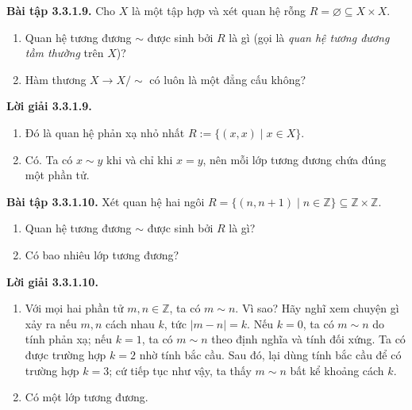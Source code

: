 \noindent\textbf{Bài tập 3.3.1.9.} Cho $X$ là một tập hợp và xét quan hệ rỗng $R=\varnothing\subseteq X\times X$.
\begin{enumerate}[label=\alph*.]
\item Quan hệ tương đương $\sim$ được sinh bởi $R$ là gì (gọi là \emph{quan hệ tương đương tầm thường} trên $X$)?
\item Hàm thương $X\to X/{\sim}$ có luôn là một đẳng cấu không?
\end{enumerate}
\noindent\textbf{Lời giải 3.3.1.9.}\keepwithnext
\begin{enumerate}[label=\alph*.]
\item Đó là quan hệ phản xạ nhỏ nhất $R:=\{(x,x)\mid x\in X\}$.
\item Có. Ta có $x\sim y$ khi và chỉ khi $x=y$, nên mỗi lớp tương đương chứa đúng một phần tử.
\end{enumerate}

\noindent\textbf{Bài tập 3.3.1.10.} Xét quan hệ hai ngôi $R=\{(n,n+1)\mid n\in\mathbb Z\}\subseteq\mathbb Z\times\mathbb Z$.
\begin{enumerate}[label=\alph*.]
\item Quan hệ tương đương $\sim$ được sinh bởi $R$ là gì?
\item Có bao nhiêu lớp tương đương?
\end{enumerate}
\noindent\textbf{Lời giải 3.3.1.10.}\keepwithnext
\begin{enumerate}[label=\alph*.]
\item Với mọi hai phần tử $m,n\in\mathbb Z$, ta có $m\sim n$. Vì sao? Hãy nghĩ xem chuyện gì xảy ra nếu $m,n$ cách nhau $k$, tức $|m-n|=k$. Nếu $k=0$, ta có $m\sim n$ do tính phản xạ; nếu $k=1$, ta có $m\sim n$ theo định nghĩa và tính đối xứng. Ta có được trường hợp $k=2$ nhờ tính bắc cầu. Sau đó, lại dùng tính bắc cầu để có trường hợp $k=3$; cứ tiếp tục như vậy, ta thấy $m\sim n$ bất kể khoảng cách $k$.
\item Có một lớp tương đương.
\end{enumerate}


